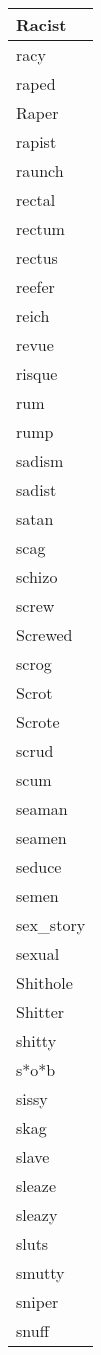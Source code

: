 \begin{longtable}{|l|}
Racist \\ \hline 
racy \\ \hline 
raped \\ \hline 
Raper \\ \hline 
rapist \\ \hline 
raunch \\ \hline 
rectal \\ \hline 
rectum \\ \hline 
rectus \\ \hline 
reefer \\ \hline 
reich \\ \hline 
revue \\ \hline 
risque \\ \hline 
rum \\ \hline 
rump \\ \hline 
sadism \\ \hline 
sadist \\ \hline 
satan \\ \hline 
scag \\ \hline 
schizo \\ \hline 
screw \\ \hline 
Screwed \\ \hline 
scrog \\ \hline 
Scrot \\ \hline 
Scrote \\ \hline 
scrud \\ \hline 
scum \\ \hline 
seaman \\ \hline 
seamen \\ \hline 
seduce \\ \hline 
semen \\ \hline 
sex\_story \\ \hline 
sexual \\ \hline 
Shithole \\ \hline 
Shitter \\ \hline 
shitty \\ \hline 
s*o*b \\ \hline 
sissy \\ \hline 
skag \\ \hline 
slave \\ \hline 
sleaze \\ \hline 
sleazy \\ \hline 
sluts \\ \hline 
smutty \\ \hline 
sniper \\ \hline 
snuff \\ \hline 

\end{longtable}
